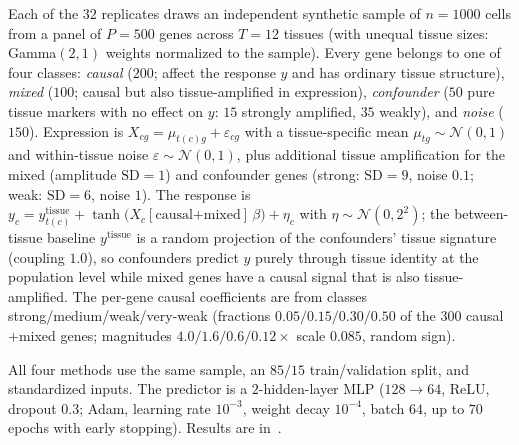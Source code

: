 Each of the $32$ replicates draws an independent synthetic sample of $n=1000$ cells from a panel of $P=500$ genes across $T=12$ tissues (with unequal tissue sizes: Gamma$(2,1)$ weights normalized to the sample). Every gene belongs to one of four classes: \emph{causal} ($200$; affect the response $y$ and has ordinary tissue structure), \emph{mixed} ($100$; causal but also tissue-amplified in expression), \emph{confounder} ($50$ pure tissue markers with no effect on $y$: $15$ strongly amplified, $35$ weakly), and \emph{noise} ($150$). Expression is $X_{cg}=\mu_{t(c)g}+\varepsilon_{cg}$ with a tissue-specific mean $\mu_{tg}\sim\mathcal{N}(0,1)$ and within-tissue noise $\varepsilon\sim\mathcal{N}(0,1)$, plus additional tissue amplification for the mixed (amplitude $\mathrm{SD}=1$) and confounder genes (strong: $\mathrm{SD}=9$, noise $0.1$; weak: $\mathrm{SD}=6$, noise $1$). The response is $y_c = y^{\text{tissue}}_{t(c)} + \tanh\!\big(X_c[\text{causal+mixed}]\,\beta\big) + \eta_c$ with $\eta\sim\mathcal{N}(0,2^2)$; the between-tissue baseline $y^{\text{tissue}}$ is a random projection of the confounders' tissue signature (coupling $1.0$), so confounders predict $y$ purely through tissue identity at the population level while mixed genes have a causal signal that is also tissue-amplified. The per-gene causal coefficients are from classes strong/medium/weak/very-weak (fractions $0.05/0.15/0.30/0.50$ of the $300$ causal$+$mixed genes; magnitudes $4.0/1.6/0.6/0.12\times$ scale $0.085$, random sign).

All four methods use the same sample, an $85/15$ train/validation split, and standardized inputs. The predictor is a $2$-hidden-layer MLP ($128\!\to\!64$, ReLU, dropout $0.3$; Adam, learning rate $10^{-3}$, weight decay $10^{-4}$, batch $64$, up to $70$ epochs with early stopping). Results are in~.
